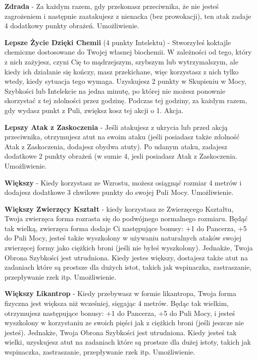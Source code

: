 \textbf{Zdrada}\label{sec:Zdrada} - Za każdym razem, gdy przekonasz przeciwnika, że nie jesteś zagrożeniem i następnie zaatakujesz z nienacka (bez prowokacji), ten atak zadaje 4 dodatkowy punkty obrażeń. Umożliwienie. 

\textbf{Lepsze Życie Dzięki Chemii}\label{sec:Lepsze Życie Dzięki Chemii} (4 punkty Intelektu) - Stworzyłeś koktajle chemiczne dostosowane do Twojej własnej biochemii. W zależności od tego, który z nich zażyjesz, czyni Cię to mądrzejszym, szybszym lub wytrzymalszym, ale kiedy ich działanie się kończy, masz przekichane, więc korzystasz z nich tylko wtedy, kiedy sytuacja tego wymaga. Uzyskujesz 2 punkty w Skupieniu w Mocy, Szybkości lub Intelekcie na jedna minutę, po której nie możesz ponownie skorzystać z tej zdolności przez godzinę. Podczas tej godziny, za każdym razem, gdy wydasz punkt z Puli, zwiększ kosz tej akcji o 1. Akcja.

\textbf{Lepszy Atak z Zaskoczenia}\label{sec:Lepszy Atak z Zaskoczenia} - Jeśli atakujesz z ukrycia lub przed akcją przeciwnika, otrzymujesz atut na swoim ataku (jeśli posiadasz także zdolność Atak z Zaskoczenia, dodajesz obydwa atuty). Po udanym ataku, zadajesz dodatkowe 2 punkty obrażeń (w sumie 4, jesli posiadasz Atak z Zaskoczenia. Umożliwienie.

\textbf{Większy}\label{sec:Większy} - Kiedy korzystasz ze Wzrostu, możesz osiągnąć rozmiar 4 metrów i dodajesz dodatkowe 3 chwilowe punkty do swojej Puli Mocy. Umożliwienie.

\textbf{Większy Zwierzęcy Kształt}\label{sec:Większy Zwierzęcy Kształt} - kiedy korzystasz ze Zwierzęcego Kształtu, Twoja zwierzęca forma rozrasta się do podwójnego normalnego rozmiaru. Będąć tak wielką, zwierzęca forma dodaje Ci następujące bonusy: +1 do Pancerza, +5 do Puli Mocy, jesteś także wyszkolony w używaniu naturalnych ataków swojej zwierzęcej formy jako ciężkich broni (jeśli nie byłeś wyszkolony). Jednakże, Twoja Obrona Szybkości jest utrudniona. Kiedy jestes większy, dostajesz także atut na zadaniach które są prostsze dla dużych istot, takich jak wspinaczka, zastraszanie, przepływanie rzek itp. Umożliwienie. 

\textbf{Większy Likantrop}\label{sec:Większy Likantrop} - Kiedy przebywasz w formie likantropa, Twoja forma fizyczna jest większa niż wcześniej, sięgając 4 metrów. Będąc tak wielkim, otrzymujesz następujące bonusy: +1 do Pancerza, +5 do Puli Mocy, i jesteś wyszkolony w korzystaniu ze swoich pięści jak z ciężkich broni (jeśli jeszcze nie jesteś). Jednakże, Twoja Obrona Szybkości jest utrudniona. Kiedy jesteś tak wielki, uzyskujesz atut na zadaniach które są prostsze dla dużej istoty, takich jak wspinaczka, zastraszanie, przepływanie rzek itp. Umożliwienie. 

